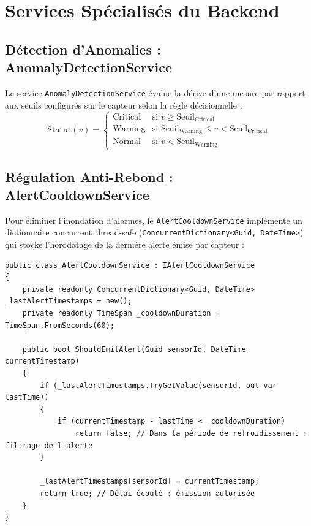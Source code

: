 \section{Services Spécialisés du Backend}

\subsection{Détection d'Anomalies : AnomalyDetectionService}

Le service \texttt{AnomalyDetectionService} évalue la dérive d'une mesure par rapport aux seuils configurés sur le capteur selon la règle décisionnelle :
\begin{equation}
\text{Statut}(v) = 
\begin{cases} 
\text{Critical} & \text{si } v \ge \text{Seuil}_{\text{Critical}} \\
\text{Warning} & \text{si } \text{Seuil}_{\text{Warning}} \le v < \text{Seuil}_{\text{Critical}} \\
\text{Normal} & \text{si } v < \text{Seuil}_{\text{Warning}}
\end{cases}
\end{equation}

\subsection{Régulation Anti-Rebond : AlertCooldownService}

Pour éliminer l'inondation d'alarmes, le \texttt{AlertCooldownService} implémente un dictionnaire concurrent thread-safe (\texttt{ConcurrentDictionary<Guid, DateTime>}) qui stocke l'horodatage de la dernière alerte émise par capteur :

\begin{lstlisting}[language=CSharpCustom, caption={Implémentation du service anti-rebond AlertCooldownService}]
public class AlertCooldownService : IAlertCooldownService
{
    private readonly ConcurrentDictionary<Guid, DateTime> _lastAlertTimestamps = new();
    private readonly TimeSpan _cooldownDuration = TimeSpan.FromSeconds(60);

    public bool ShouldEmitAlert(Guid sensorId, DateTime currentTimestamp)
    {
        if (_lastAlertTimestamps.TryGetValue(sensorId, out var lastTime))
        {
            if (currentTimestamp - lastTime < _cooldownDuration)
                return false; // Dans la période de refroidissement : filtrage de l'alerte
        }

        _lastAlertTimestamps[sensorId] = currentTimestamp;
        return true; // Délai écoulé : émission autorisée
    }
}
\end{lstlisting}


